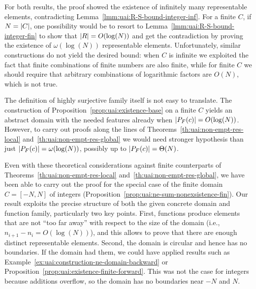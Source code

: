 For both results, the proof showed the existence of infinitely many representable elements, contradicting Lemma~\ref{lmm:uai:R-S-bound-integer-inf}. For a finite $C$, if $N = \lvert C\rvert$, one possibility would be to resort to Lemma~\ref{lmm:uai:R-S-bound-integer-fin} to show that $\lvert R\rvert = O(\log(N))$ and get the contradiction by proving the existence of $\omega(\log(N))$ representable elements. Unfortunately, similar constructions do not yield the desired bound: when $C$ is infinite we exploited the fact that finite combinations of finite numbers are also finite, while for finite $C$ we should require that arbitrary combinations of logarithmic factors are $O(N)$, which is not true.

The definition of highly surjective family itself is not easy to translate. The construction of Proposition~\ref{prop:uai:existence-base} on a finite $C$ yields an abstract domain with the needed features already when $\lvert P_F(c)\rvert = O(\log(N))$. However, to carry out proofs along the lines of Theorems~\ref{th:uai:non-empt-res-local} and~\ref{th:uai:non-empt-res-global} we would need stronger hypothesis than just $\lvert P_F(c)\rvert = \omega(\log(N))$, possibly up to $\lvert P_F(c)\rvert = \Theta(N)$.

Even with these theoretical considerations against finite counterparts of Theorems~\ref{th:uai:non-empt-res-local} and~\ref{th:uai:non-empt-res-global}, we have been able to carry out the proof for the special case of the finite domain $C = [-N, N]$ of integers (Proposition~\ref{prop:uai:ne-sum-nonexsistence-fin}). Our result exploits the precise structure of both the given concrete domain and function family, particularly two key points.
First, functions produce elements that are not ``too far away'' with respect to the size of the domain (i.e., $n_{i+1} - n_{i} = O(\log(N))$), and this allows to prove that there are enough distinct representable elements.
Second, the domain is circular and hence has no boundaries. If the domain had them, we could have applied results such as Example~\ref{ex:uai:construction-ne-domain-backward} or Proposition~\ref{prop:uai:existence-finite-forward}. This was not the case for integers because additions overflow, so the domain has no boundaries near $-N$ and $N$.

